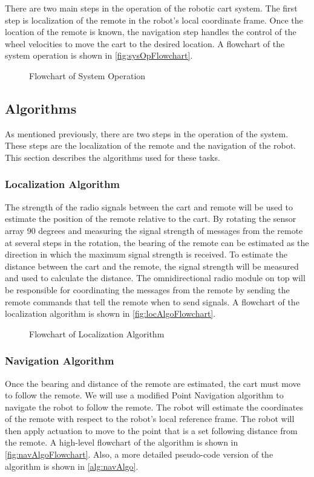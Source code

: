 \documentclass[letterpaper,12pt]{article}   %
\begin{document}
\vspace*{12pt}
\noindent
There are two main steps in the operation of the robotic cart system. The first step is localization of the remote in the robot's local coordinate frame. Once the location of the remote is known, the navigation step handles the control of the wheel velocities to move the cart to the desired location. A flowchart of the system operation is shown in \autoref{fig:sysOpFlowchart}.

\begin{figure}
  \centering
  
  \caption{Flowchart of System Operation}
  \label{fig:sysOpFlowchart}
\end{figure}

\subsection{Algorithms}
As mentioned previously, there are two steps in the operation of the system. These steps are the localization of the remote and the navigation of the robot. This section describes the algorithms used for these tasks.

\subsubsection{Localization Algorithm}
The strength of the radio signals between the cart and remote will be used to estimate the position of the remote relative to the cart. By rotating the sensor array 90 degrees and measuring the signal strength of messages from the remote at several steps in the rotation, the bearing of the remote can be estimated as the direction in which the maximum signal strength is received. To estimate the distance between the cart and the remote, the signal strength will be measured and used to calculate the distance. The omnidirectional radio module on top will be responsible for coordinating the messages from the remote by sending the remote commands that tell the remote when to send signals. A flowchart of the localization algorithm is shown in \autoref{fig:locAlgoFlowchart}.

\begin{figure}
  \centering
  
  \caption{Flowchart of Localization Algorithm}
  \label{fig:locAlgoFlowchart}
\end{figure}

\subsubsection{Navigation Algorithm}
Once the bearing and distance of the remote are estimated, the cart must move to follow the remote. We will use a modified Point Navigation algorithm to navigate the robot to follow the remote. The robot will estimate the coordinates of the remote with respect to the robot's local reference frame. The robot will then apply actuation to move to the point that is a set following distance from the remote. A high-level flowchart of the algorithm is shown in \autoref{fig:navAlgoFlowchart}. Also, a more detailed pseudo-code version of the algorithm is shown in \autoref{alg:navAlgo}.
\end{document}
